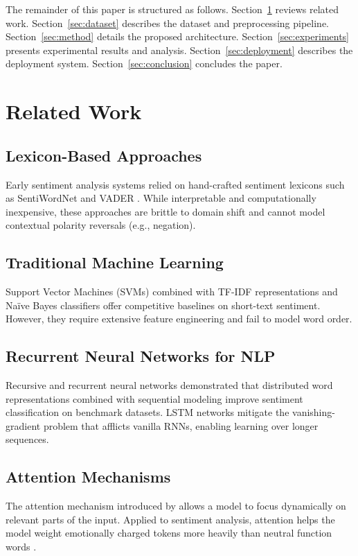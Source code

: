 \documentclass[conference]{IEEEtran}
\begin{document}
The remainder of this paper is structured as follows.
Section~\ref{sec:related} reviews related work.
Section~\ref{sec:dataset} describes the dataset and preprocessing
pipeline. Section~\ref{sec:method} details the proposed architecture.
Section~\ref{sec:experiments} presents experimental results and
analysis. Section~\ref{sec:deployment} describes the deployment system.
Section~\ref{sec:conclusion} concludes the paper.

\section{Related Work}
\label{sec:related}

\subsection{Lexicon-Based Approaches}
Early sentiment analysis systems relied on hand-crafted sentiment
lexicons such as SentiWordNet \cite{esuli2006sentiwordnet} and VADER
\cite{hutto2014vader}. While interpretable and computationally
inexpensive, these approaches are brittle to domain shift and cannot
model contextual polarity reversals (e.g., negation).

\subsection{Traditional Machine Learning}
Support Vector Machines (SVMs) combined with TF-IDF representations
\cite{pang2002thumbs} and Naïve Bayes classifiers offer competitive
baselines on short-text sentiment. However, they require extensive
feature engineering and fail to model word order.

\subsection{Recurrent Neural Networks for NLP}
Recursive and recurrent neural networks \cite{socher2013recursive}
demonstrated that distributed word representations combined with
sequential modeling improve sentiment classification on benchmark
datasets. LSTM networks \cite{hochreiter1997lstm} mitigate the
vanishing-gradient problem that afflicts vanilla RNNs, enabling
learning over longer sequences.

\subsection{Attention Mechanisms}
The attention mechanism introduced by \citeauthor{bahdanau2015attention}
\cite{bahdanau2015attention} allows a model to focus dynamically on
relevant parts of the input. Applied to sentiment analysis, attention
helps the model weight emotionally charged tokens more heavily than
neutral function words \cite{wang2016attention}.
\end{document}
